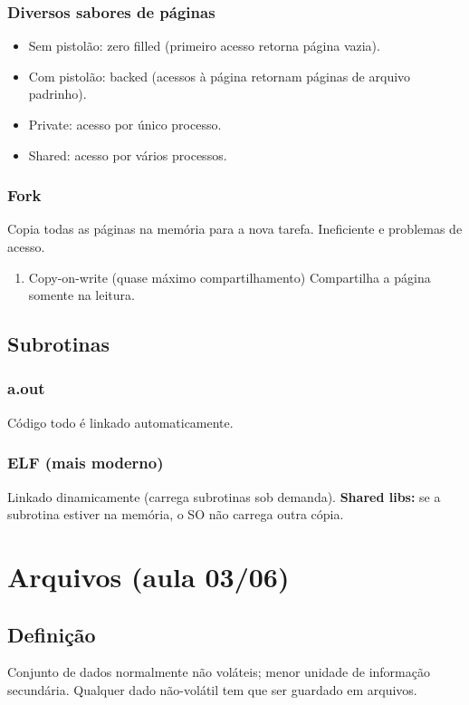 \documentclass[11pt]{article}
\begin{document}
\subsubsection{Diversos sabores de páginas}
\label{sec:orga602381}
\begin{itemize}
\item Sem pistolão: zero filled (primeiro acesso retorna página vazia).
\item Com pistolão: backed (acessos à página retornam páginas de arquivo padrinho).

\item Private: acesso por único processo.
\item Shared: acesso por vários processos.
\end{itemize}

\subsubsection{Fork}
\label{sec:orgb2b57ec}
Copia todas as páginas na memória para a nova tarefa. Ineficiente e problemas de
acesso.

\begin{enumerate}
\item Copy-on-write (quase máximo compartilhamento)
\label{sec:org142982e}
Compartilha a página somente na leitura.
\end{enumerate}

\subsection{Subrotinas}
\label{sec:org67c1a49}

\subsubsection{a.out}
\label{sec:org1008bb4}
Código todo é linkado automaticamente.

\subsubsection{ELF (mais moderno)}
\label{sec:org467f139}
   Linkado dinamicamente (carrega subrotinas sob demanda). \textbf{Shared libs:} se a subrotina
estiver na memória, o SO não carrega outra cópia.
\section{Arquivos (aula 03/06)}
\label{sec:orgbc7f722}
\subsection{Definição}
\label{sec:org18e933e}
Conjunto de dados normalmente não voláteis; menor unidade de informação secundária.
Qualquer dado não-volátil tem que ser guardado em arquivos.
\end{document}
